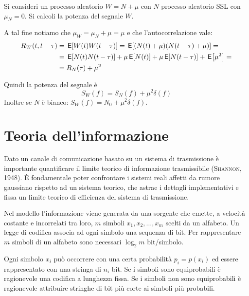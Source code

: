 \begin{esercizio}
Si consideri un processo aleatorio $W = N+\mu$ con $N$ processo aleatorio SSL con $\mu_N = 0$. Si calcoli la potenza del segnale $W$.

A tal fine notiamo che $\mu_W = \mu_N + \mu = \mu$ e che l'autocorrelazione vale:
\begin{align*}
	R_W(t,t-\tau) &= \,{\operatorname{\mathsf{E}}}\!\left[{W(t)W(t-\tau)}\right] = \,{\operatorname{\mathsf{E}}}\!\left[{(N(t)+\mu)(N(t-\tau)+\mu)}\right] = \\
	&= \,{\operatorname{\mathsf{E}}}\!\left[{N(t)N(t-\tau)}\right] +\mu\,{\operatorname{\mathsf{E}}}\!\left[{N(t)}\right] +\mu\,{\operatorname{\mathsf{E}}}\!\left[{N(t-\tau)}\right] +\,{\operatorname{\mathsf{E}}}\!\left[{\mu^2}\right] = \\
	&= R_N(\tau) +\mu^2
\end{align*}

Quindi la potenza del segnale è $$S_W(f) = S_N(f)+\mu^2\delta(f)$$
Inoltre se $N$ è bianco: $S_W(f) = N_0 +\mu^2\delta(f)$.

\begin{center}\end{center}
\end{esercizio}

\section{Teoria dell'informazione}
Dato un canale di comunicazione basato su un sistema di trasmissione è importante quantificare il limite teorico di informazione trasmissibile (\textsc{Shannon}, 1948). \`{E} fondamentale poter confrontare i sistemi reali affetti da rumore gaussiano rispetto ad un sistema teorico, che astrae i dettagli implementativi e fissa un limite teorico di efficienza del sistema di trasmissione.

Nel modello l'informazione viene generata da una sorgente che emette, a velocità costante e incorrelati tra loro, $m$ simboli $x_1,x_2,\dots,x_m$ scelti da un alfabeto. Un legge di codifica associa ad ogni simbolo una sequenza di bit. Per rappresentare $m$ simboli di un alfabeto sono necessari $\log_2 m$ bit/simbolo.

Ogni simbolo $x_i$ può occorrere con una certa probabilità $p_i=p(x_i)$ ed essere rappresentato con una stringa di $n_i$ bit.
Se i simboli sono equiprobabili è ragionevole una codifica a lunghezza fissa. Se i simboli non sono equiprobabili è ragionevole attribuire stringhe di bit più corte ai simboli più probabili.

